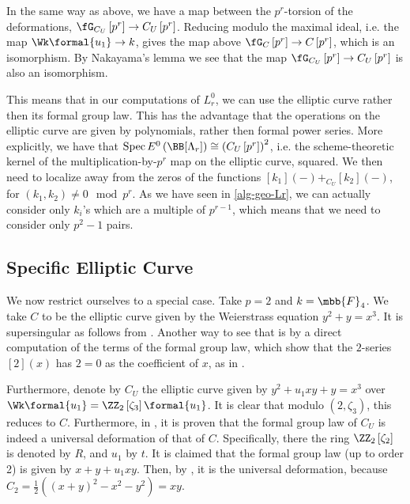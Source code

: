 In the same way as above, we have a map between the $p^r$-torsion of the deformations, $\fG_{C_U}\left[p^r\right] \to C_U\left[p^r\right]$.
Reducing modulo the maximal ideal, i.e. the map $\Wk\formal{u_1} \to k$, gives the map above $\fG_C\left[p^r\right] \to C\left[p^r\right]$, which is an isomorphism.
By Nakayama's lemma we see that the map $\fG_{C_U}\left[p^r\right] \to C_U\left[p^r\right]$ is also an isomorphism.

This means that in our computations of $L_r^0$, we can use the elliptic curve rather then its formal group law.
This has the advantage that the operations on the elliptic curve are given by polynomials, rather then formal power series.
More explicitly, we have that $\spec E^0\left(\BB[\Lambda_r]\right) \cong \left(C_U\left[p^r\right]\right)^2$, i.e. the scheme-theoretic kernel of the multiplication-by-$p^r$ map on the elliptic curve, squared.
We then need to localize away from the zeros of the functions $[k_1]\left(-\right) +_{C_U} [k_2]\left(-\right)$, for $\left(k_1, k_2\right) \neq 0 \mod p^r$.
As we have seen in \ref{alg-geo-Lr}, we can actually consider only $k_i$'s which are a multiple of $p^{r-1}$, which means that we need to consider only $p^2-1$ pairs.



\subsection{Specific Elliptic Curve}

We now restrict ourselves to a special case.
Take $p = 2$ and $k = \mbb{F}_4$.
We take $C$ to be the elliptic curve given by the Weierstrass equation $y^2 + y = x^3$.
It is supersingular as follows from \cite[exercise V.5.7 combined with proposition A.1.1.c]{Sil}.
Another way to see that is by a direct computation of the terms of the formal group law, which show that the $2$-series $\left[2\right]\left(x\right)$ has $2=0$ as the coefficient of $x$, as in \cite[6.1.4]{Bea}.

Furthermore, denote by $C_U$ the elliptic curve given by $y^2 + u_1 xy + y = x^3$ over $\Wk\formal{u_1} = \ZZ_2\left[\zeta_3\right]\formal{u_1}$.
It is clear that modulo $\left(2, \zeta_3\right)$, this reduces to $C$.
Furthermore, in \cite[3.5]{LT}, it is proven that the formal group law of $C_U$ is indeed a universal deformation of that of $C$.
Specifically, there the ring $\ZZ_2\left[\zeta_2\right]$ is denoted by $R$, and $u_1$ by $t$.
It is claimed that the formal group law (up to order 2) is given by $x+y+u_1 xy$.
Then, by \cite[1.1]{LT}, it is the universal deformation, because $C_2 = \frac{1}{2}\left(\left(x+y\right)^2-x^2-y^2\right)=xy$.

